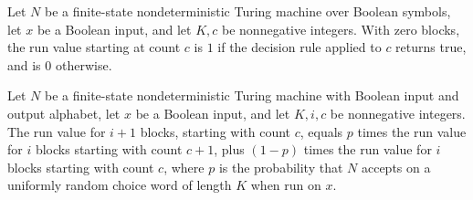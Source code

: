 \begin{theorem}
\label{Randomized.PolyAmp.runVal_zero}
\leanok
{}
Let $N$ be a finite-state nondeterministic Turing machine over Boolean symbols, let $x$
be a Boolean input, and let $K,c$ be nonnegative integers. With zero blocks, the run
value starting at count $c$ is $1$ if the decision rule applied to $c$ returns true, and
is $0$ otherwise.
\end{theorem}

\begin{theorem}
\label{Randomized.PolyAmp.runVal_succ}
\leanok
{}
Let $N$ be a finite-state nondeterministic Turing machine with Boolean input and output
alphabet, let $x$ be a Boolean input, and let $K,i,c$ be nonnegative integers. The run
value for $i+1$ blocks, starting with count $c$, equals $p$ times the run value for $i$
blocks starting with count $c+1$, plus $(1-p)$ times the run value for $i$ blocks
starting with count $c$, where $p$ is the probability that $N$ accepts on a uniformly
random choice word of length $K$ when run on $x$.
\end{theorem}

